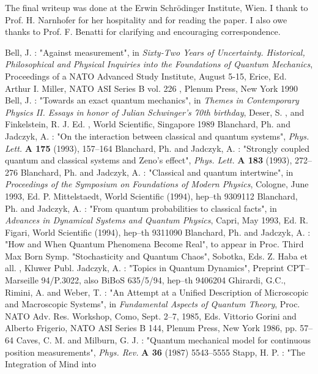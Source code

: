 \documentclass[12pt]{article}
\begin{document}
The final writeup was done at the Erwin Schr\"odinger Institute, Wien. I
thank to Prof. H. Narnhofer for her hospitality and for reading the paper.
I also owe thanks to Prof. F. Benatti for clarifying and encouraging
correspondence.
\begin{thebibliography}{99}
 Bell, J. : "Against measurement", in {\sl Sixty-Two Years
of Uncertainty. Historical, Philosophical and Physical Inquiries into the
Foundations of Quantum Mechanics}, Proceedings of a NATO Advanced Study
Institute, August 5-15, Erice, Ed. Arthur I. Miller, NATO ASI Series B vol.
226 , Plenum Press, New York 1990
 Bell,  J. : "Towards an exact quantum mechanics",  in
{\sl Themes in Contemporary Physics II.  Essays in honor of Julian
Schwinger's 70th birthday},  Deser,  S. ,  and Finkelstein,  R. J.  Ed. ,
World Scientific,  Singapore 1989
 Blanchard, Ph. and Jadczyk, A. : "On the interaction
between classical and quantum systems", {\sl Phys. Lett. }{\bf A 175}
(1993), 157--164
 Blanchard, Ph. and Jadczyk, A. : "Strongly coupled
quantum and classical systems and Zeno's effect", {\sl Phys. Lett. }{\bf A
183} (1993), 272--276
 Blanchard,  Ph.  and Jadczyk,  A. : "Classical and quantum
intertwine",  in {\sl Proceedings of the Symposium on Foundations of
Modern Physics},  Cologne,  June 1993,  Ed.  P.  Mittelstaedt,  World
Scientific  (1994), hep--th 9309112
 Blanchard,  Ph.  and Jadczyk,  A. : "From quantum
probabilities to classical facts",  in {\sl Advances in Dynamical
Systems and Quantum Physics},  Capri,  May 1993,  Ed.  R.  Figari,  World
Scientific  (1994), hep--th 9311090
 Blanchard,  Ph.  and Jadczyk,  A. :  "How and
When Quantum Phenomena Become Real",  to appear in Proc.
Third Max Born Symp.  "Stochasticity and Quantum Chaos",
Sobotka,  Eds.  Z.  Haba et all. ,  Kluwer Publ.
 Jadczyk, A. : "Topics in Quantum Dynamics", Preprint CPT--
Marseille 94/P.3022, also BiBoS 635/5/94, hep--th 9406204
 Ghirardi, G.C., Rimini, A. and Weber, T. : "An Attempt at
a Unified Description of Microscopic and Macroscopic Systems", in {\sl
Fundamental Aspects of Quantum Theory}, Proc. NATO Adv. Res. Workshop,
Como, Sept. 2--7, 1985, Eds. Vittorio Gorini and Alberto Frigerio, NATO ASI
Series B 144, Plenum Press, New York 1986, pp. 57--64
 Caves, C. M. and Milburn, G. J. : "Quantum mechanical
model for continuous position measurements", {\sl Phys. Rev.} {\bf A 36}
(1987) 5543--5555
 Stapp, H. P. : "The Integration of Mind into

\end{thebibliography}
\end{document}
